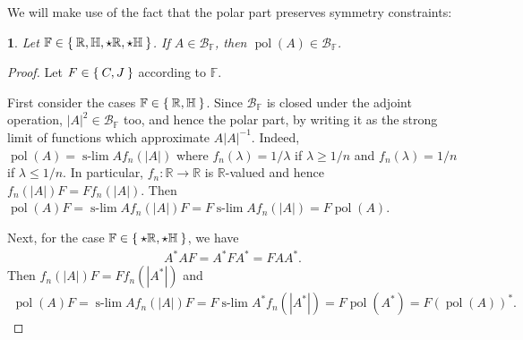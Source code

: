 \documentclass[a4paper,10pt]{article}
\numberwithin{equation}{section}
\theoremstyle{plain}
\theoremstyle{plain}
\newtheorem{lem}[thm]{\protect\lemmaname}
\theoremstyle{plain}
\theoremstyle{plain}
\theoremstyle{plain}
\theoremstyle{remark}
\theoremstyle{definition}
\theoremstyle{plain}
\providecommand{\lemmaname}{Lemma}
\newcommand{\RR}{\mathbb{R}}
\newcommand{\FF}{\mathbb{F}}
\newcommand{\calB}{\mathcal{B}}
\DeclareMathOperator*{\slim}{s-lim}
\newcommand{\HH}{\mathbb{H}}
\newcommand{\im}{\operatorname{im}}
\newcommand{\corr}{\color{red}}
\newcommand{\nc}{\normalcolor}
\newcommand{\eq}[1]{\begin{align*}#1\end{align*}}
\newcommand{\polar}{\operatorname{pol}}
\begin{document}
	We will make use of the fact that the polar part preserves symmetry constraints:
	\begin{lem}\label{lem:polar part preserve symmetry}
		Let $\FF\in\Set{\RR,\HH,\star\RR,\star\HH}$. If $A\in\calB_\FF$, then $\polar(A)\in\calB_\FF$.
	\end{lem}
	\begin{proof}
		Let $F\in \Set{C,J}$ according to $\FF$.
		
		First consider the cases $\FF\in\Set{\RR,\HH}$. Since $\calB_\FF$ is closed under the adjoint operation, $|A|^2\in\calB_\FF$ too, and hence the polar part, by writing it as the strong limit of functions which approximate $ A |A|^{-1}$. Indeed, $\polar(A)=\slim Af_n(|A|)$ where $f_n(\lambda)=1/\lambda$ if $\lambda\geq 1/n$ and $f_n(\lambda)=1/n$ if $\lambda\leq 1/n$. In particular, $f_n:\RR\to\RR$ is $\RR$-valued and hence $f_n(|A|)F=F f_n(|A|)$. Then $\polar(A)F=\slim Af_n(|A|)F=F \slim Af_n(|A|)=F \polar(A)$.
		
		Next, for the case $\FF\in\Set{\star\RR,\star\HH}$, we have \eq{A^*AF=A^*F A^*=F AA^*.} Then $f_n(|A|)F=F f_n(|A^*|)$ and \eq{\polar(A)F=\slim Af_n(|A|)F=F \slim A^*f_n(|A^*|)=F \polar(A^*)=F(\polar(A))^*.}
	\end{proof}
	
	
	
\end{document}
